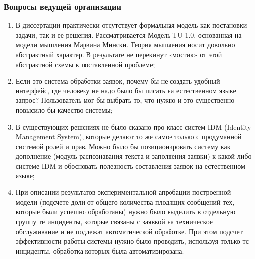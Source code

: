 \documentclass[14pt]{beamer}
\begin{document}
\begin{frame}
\frametitle{Вопросы ведущей организации}
\begin{enumerate}
\scriptsize 
  \item В диссертации практически отсутствует формальная модель как постановки задачи, так и ее решения. Рассматривается Модель TU 1.0. основанная на модели мышления Марвина Мински. Теория мышления носит довольно абстрактный характер. В результате не перекинут «мостик» от этой абстрактной схемы к поставленной проблеме;

   \item Если это система обработки заявок, почему бы не создать удобный интерфейс, где человеку не надо было бы писать на естественном языке запрос? Пользователь мог бы выбрать то, что нужно и это существенно повысило бы качество системы;

\item В существующих решениях не было сказано про класс систем IDM (Identity Management System), которые делают то же самое только с продуманной системой ролей и прав. Можно было бы позиционировать систему как дополнение (модуль распознавания текста и заполнения заявки) к какой-либо системе IDM и обосновать полезность составления заявок на естественном языке;
\item При описании результатов экспериментальной апробации построенной модели (подсчете доли от общего количества плодящих сообщений тех, которые были успешно обработаны) нужно было выделить в отдельную группу те инциденты, которые связаны с заявкой на техническое обслуживание и не подлежат автоматической обработке. При этом подсчет эффективности работы системы нужно было проводить, используя только тс инциденты, обработка которых была автоматизирована.
 

\end{enumerate}
\end{frame}
\end{document}
